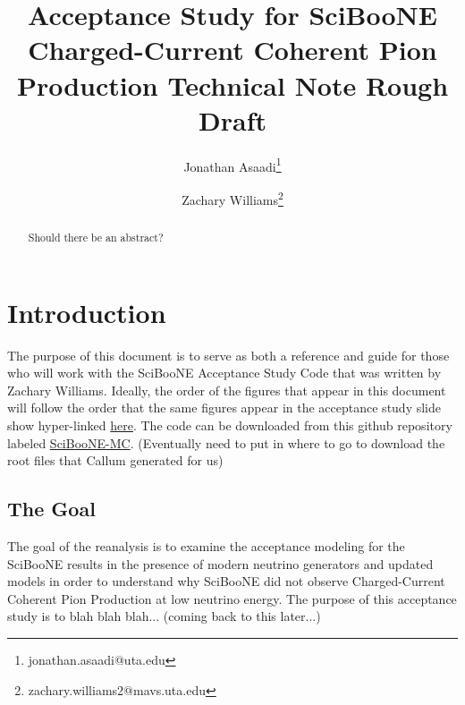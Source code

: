 \documentclass[11pt]{article}
\title{Acceptance Study for SciBooNE Charged-Current Coherent Pion Production Technical Note Rough Draft}
\author[1]{Jonathan Asaadi\thanks{jonathan.asaadi@uta.edu}}
\author[1]{Zachary Williams\thanks{zachary.williams2@mavs.uta.edu}}
\affil[1]{Department of Physics, The University of Texas at Arlington}
\begin{document}
\begin{minipage}[h]{\textwidth}
\maketitle
\begin{abstract}
Should there be an abstract?
\end{abstract}
\end{minipage}
\newpage



\section{Introduction}
The purpose of this document is to serve as both a reference and guide for those who will work with the SciBooNE Acceptance Study Code that was written by Zachary Williams. Ideally, the order of the figures that appear in this document will follow the order that the same figures appear in the acceptance study slide show hyper-linked \href{https://drive.google.com/open?id=1bMB4h3mLkGnKXWI7Tkn8edYM4Eyt6c9w6497nT9lB3A}{here}. The code can be downloaded from this github repository labeled \href{https://github.com/williamszg/SciBooNE-MC}{SciBooNE-MC}. (Eventually need to put in where to go to download the root files that Callum generated for us)

\subsection{The Goal}
The goal of the reanalysis is to examine the acceptance modeling for the SciBooNE results in the presence of modern neutrino generators and updated models in order to understand why SciBooNE did not observe Charged-Current Coherent Pion Production at low neutrino energy. The purpose of this acceptance study is to blah blah blah... (coming back to this later...)



\end{document}

